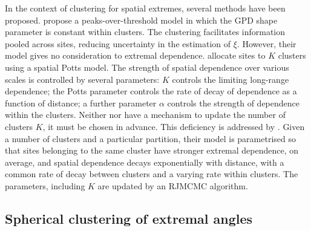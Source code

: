 \documentclass[en-GB, a4paper, nobind]{templates/bathreport}
\begin{document}
In the context of clustering for spatial extremes, several methods have been proposed. \textcite{carreauPartitioningHazardSubregions2017} propose a peaks-over-threshold model in which the GPD shape parameter is constant within clusters. The clustering facilitates information pooled across sites, reducing uncertainty in the estimation of \(\xi\). However, their model gives no consideration to extremal dependence. \textcite{reichSpatialMarkovModel2019} allocate sites to \(K\) clusters using a spatial Potts model. The strength of spatial dependence over various scales is controlled by several parameters: \(K\) controls the limiting long-range dependence; the Potts parameter controls the rate of decay of dependence as a function of distance; a further parameter \(\alpha\) controls the strength of dependence within the clusters. Neither \textcite{carreauPartitioningHazardSubregions2017} nor \textcite{reichSpatialMarkovModel2019} have a mechanism to update the number of clusters \(K\), it must be chosen in advance. This deficiency is addressed by \textcite{rohrbeckBayesianSpatialClustering2020}. Given a number of clusters and a particular partition, their model is parametrised so that sites belonging to the same cluster have stronger extremal dependence, on average, and spatial dependence decays exponentially with distance, with a common rate of decay between clusters and a varying rate within clusters. The parameters, including \(K\) are updated by an RJMCMC algorithm.

\hypertarget{spherical-clustering-of-extremal-angles}{%
\subsection{Spherical clustering of extremal angles}\label{spherical-clustering-of-extremal-angles}}
\end{document}

